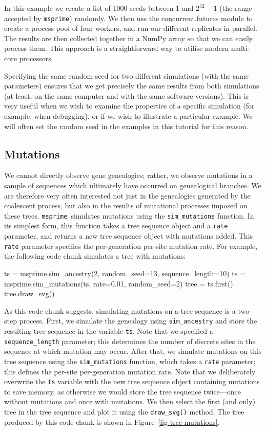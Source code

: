 \documentclass[graybox]{svmult}
\newcommand{\msprime}[0]{\texttt{msprime}}
\begin{document}
In this example we create a list of 1000 seeds between 1 and $2^{32} -
1$ (the range accepted by \msprime) randomly. We then use the
concurrent.futures module to create a process pool of four workers, and
run our different replicates in parallel. The results are then
collected together in a NumPy array so that we can easily process them.
This approach is a straightforward way to utilise modern
multi-core processors.

Specifying the same random seed for two different simulations (with the
same parameters) ensures that we get precisely the same results from
both simulations (at least, on the same computer and with the same
software versions). This is very useful when we wish to examine the
properties of a specific simulation (for example, when debugging), or if
we wish to illustrate a particular example. We will often set the random
seed in the examples in this tutorial for this reason.

\subsection{Mutations}\label{mutations}

We cannot directly observe gene genealogies; rather, we observe mutations in a
sample of sequences which ultimately have occurred on genealogical branches. We
are therefore very often interested not just in the genealogies generated by
the coalescent process, but also in the results of mutational processes imposed
on these trees. \msprime\ simulates mutations using the \texttt{sim\_mutations}
function. In its simplest form, this function takes a tree sequence object and
a \texttt{rate} parameter, and returns a new tree sequence object with
mutations added. This \texttt{rate} parameter specifies the per-generation
per-site mutation rate. For example, the following code chunk simulates a tree
with mutations:



\begin{pythoncode}
ts = msprime.sim_ancestry(2, random_seed=13, sequence_length=10)
ts = msprime.sim_mutations(ts, rate=0.01, random_seed=2)
tree = ts.first()
tree.draw_svg()
\end{pythoncode}

As this code chunk suggests, simulating mutations on a tree sequence is a two-step process.
First, we simulate the genealogy using \texttt{sim\_ancestry} and store the resulting
tree sequence in the variable \texttt{ts}. Note that we specified a \texttt{sequence\_length} parameter;
this determines the number of discrete sites in the sequence at which mutation
may occur. After that, we simulate mutations on this tree sequence 
using the \texttt{sim\_mutations} function, which takes a 
\texttt{rate} parameter; this
defines the per-site per-generation mutation rate. 
Note that we deliberately overwrite the \texttt{ts} variable
with the new tree sequence object containing 
mutations to save memory, as otherwise we would
store the tree sequence twice---once without mutations and once with mutations. 
We then
select the first (and only) tree in the tree sequence and plot it using the \texttt{draw\_svg()}
method. The tree produced by this code chunk is shown in Figure~\ref{fig-tree-mutations}.
\end{document}
